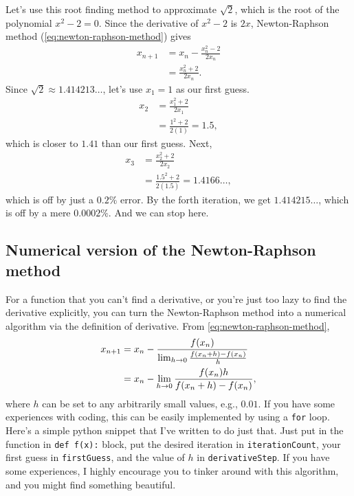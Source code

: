 Let's use this root finding method to approximate $\sqrt{2}$, which is the root of the polynomial $x^2 - 2 = 0$. Since the derivative of $x^2 - 2$ is $2x$, Newton-Raphson method (\cref{eq:newton-raphson-method}) gives
\begin{align}
  x_{n + 1} & = x_n - \frac{x_n^2 - 2}{2x_n} \\
            & = \frac{x_n^2 + 2}{2x_n}.
\end{align}
Since $\sqrt{2} \approx 1.414213\dots$, let's use $x_1 = 1$ as our first guess.
\begin{align}
  x_2 & = \frac{x_1^2 + 2}{2x_1}      \\
      & = \frac{1^2 + 2}{2(1)} = 1.5,
\end{align}
which is closer to $1.41$ than our first guess. Next,
\begin{align}
  x_3 & = \frac{x_2^2 + 2}{2x_2}                  \\
      & = \frac{1.5^2 + 2}{2(1.5)} = 1.4166\dots,
\end{align}
which is off by just a $0.2\%$ error. By the forth iteration, we get $1.414215\dots$, which is off by a mere $0.0002\%$. And we can stop here.

\subsection{Numerical version of the Newton-Raphson method}

For a function that you can't find a derivative, or you're just too lazy to find the derivative explicitly, you can turn the Newton-Raphson method into a numerical algorithm via the definition of derivative. From \cref{eq:newton-raphson-method},
\begin{align}
  x_{n + 1} & = x_n - \frac{f(x_n)}{\lim_{h \rightarrow 0}\frac{f(x_n + h) - f(x_n)}{h}} \\
            & = x_n - \lim_{h \rightarrow 0}\frac{f(x_n)h}{f(x_n + h) - f(x_n)},
\end{align}
where $h$ can be set to any arbitrarily small values, e.g., $0.01$. If you have some experiences with coding, this can be easily implemented by using a \texttt{for} loop. Here's a simple python snippet that I've written to do just that. Just put in the function in \texttt{def f(x):} block, put the desired iteration in \texttt{iterationCount}, your first guess in \texttt{firstGuess}, and the value of $h$ in \texttt{derivativeStep}. If you have some experiences, I highly encourage you to tinker around with this algorithm, and you might find something beautiful.

